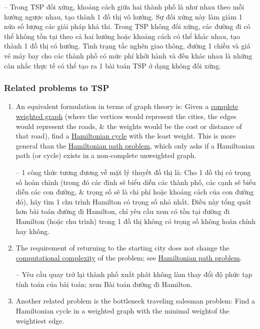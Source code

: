 \documentclass{article}
\begin{document}
-- Trong TSP đối xứng, khoảng cách giữa hai thành phố là như nhau theo mỗi hướng ngược nhau, tạo thành 1 đồ thị vô hướng. Sự đối xứng này làm giảm 1 nửa số lượng các giải pháp khả thi. Trong TSP không đối xứng, các đường đi có thể không tồn tại theo cả hai hướng hoặc khoảng cách có thể khác nhau, tạo thành 1 đồ thị có hướng. Tình trạng tắc nghẽn giao thông, đường 1 chiều và giá vé máy bay cho các thành phố có mức phí khởi hành và đến khác nhau là những cân nhắc thực tế có thể tạo ra 1 bài toán TSP ở dạng không đối xứng.


\subsubsection{Related problems to TSP}

\begin{enumerate}
    \item An equivalent formulation in terms of graph theory is: Given a \href{https://en.wikipedia.org/wiki/Glossary_of_graph_theory}{complete weighted graph} (where the vertices would represent the cities, the edges would represent the roads, \& the weights would be the cost or distance of that road), find a \href{https://en.wikipedia.org/wiki/Hamiltonian_cycle}{Hamiltonian cycle} with the least weight. This is more general than the \href{https://en.wikipedia.org/wiki/Hamiltonian_path_problem}{Hamiltonian path problem}, which only asks if a Hamiltonian path (or cycle) exists in a non-complete unweighted graph.
    
    -- 1 công thức tương đương về mặt lý thuyết đồ thị là: Cho 1 đồ thị có trọng số hoàn chỉnh (trong đó các đỉnh sẽ biểu diễn các thành phố, các cạnh sẽ biểu diễn các con đường, \& trọng số sẽ là chi phí hoặc khoảng cách của con đường đó), hãy tìm 1 chu trình Hamilton có trọng số nhỏ nhất. Điều này tổng quát hơn bài toán đường đi Hamilton, chỉ yêu cầu xem có tồn tại đường đi Hamilton (hoặc chu trình) trong 1 đồ thị không có trọng số không hoàn chỉnh hay không.
    \item The requirement of returning to the starting city does not change the \href{https://en.wikipedia.org/wiki/Computational_complexity_theory}{computational complexity} of the problem; see \href{https://en.wikipedia.org/wiki/Hamiltonian_path_problem}{Hamiltonian path problem}.
    
    -- Yêu cầu quay trở lại thành phố xuất phát không làm thay đổi độ phức tạp tính toán của bài toán; xem Bài toán đường đi Hamilton.
    \item Another related problem is the bottleneck traveling salesman problem: Find a Hamiltonian cycle in a weighted graph with the minimal weightof the weightiest edge. 
\end{enumerate}
\end{document}
